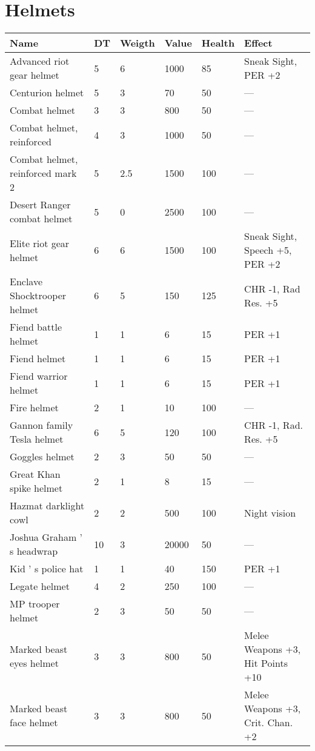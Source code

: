 \documentclass{report}
\begin{document}
\begin{table}[H]
\begin{table}[H]
\begin{table}[H]
\begin{table}[H]
\begin{table}[H]
\begin{table}[H]
\begin{table}[H]
\begin{table}[H]
\begin{table}[H]
\begin{table}[H]
\begin{table}[H]
\begin{table}[H]
\begin{table}[H]
\begin{table}[H]
\begin{table}[H]
\begin{table}[H]
\begin{table}[H]
\begin{table}[H]
\begin{table}[H]
\begin{table}[H]
\begin{table}[H]
\begin{table}[H]
\chapter{Helmets}
\begin{table}[H]
  \centering
  \begin{tabular}{p{30mm}p{30mm}p{30mm}p{30mm}p{30mm}p{30mm}}
\bfseries Name & \bfseries DT & \bfseries Weigth & \bfseries Value & \bfseries Health & \bfseries Effect \\
\hline
Advanced riot gear helmet  & 5 & 6 & 1000 & 85 & Sneak Sight, PER +2  \\
Centurion helmet  & 5 & 3 & 70 & 50 & —  \\
Combat helmet  & 3 & 3 & 800 & 50 & —  \\
Combat helmet, reinforced  & 4 & 3 & 1000 & 50 & —  \\
Combat helmet, reinforced mark 2  & 5 & 2.5  & 1500 & 100 & —  \\
Desert Ranger combat helmet  & 5 & 0 & 2500 & 100 & —  \\
Elite riot gear helmet  & 6 & 6 & 1500 & 100 & Sneak Sight, Speech +5, PER +2  \\
Enclave Shocktrooper helmet  & 6 & 5 & 150 & 125 & CHR -1, Rad Res. +5  \\
Fiend battle helmet  & 1 & 1 & 6 & 15 & PER +1  \\
Fiend helmet  & 1 & 1 & 6 & 15 & PER +1  \\
Fiend warrior helmet  & 1 & 1 & 6 & 15 & PER +1  \\
Fire helmet  & 2 & 1 & 10 & 100 & —  \\
Gannon family Tesla helmet  & 6 & 5 & 120 & 100 & CHR -1, Rad. Res. +5  \\
Goggles helmet  & 2 & 3 & 50 & 50 & —  \\
Great Khan spike helmet  & 2 & 1 & 8 & 15 & —  \\
Hazmat darklight cowl  & 2 & 2 & 500 & 100 & Night vision  \\
Joshua Graham ' s headwrap  & 10 & 3 & 20000 & 50 & —  \\
Kid ' s police hat  & 1 & 1 & 40 & 150 & PER +1  \\
Legate helmet  & 4 & 2 & 250 & 100 & —  \\
MP trooper helmet  & 2 & 3 & 50 & 50 & —  \\
Marked beast eyes helmet  & 3 & 3 & 800 & 50 & Melee Weapons +3, Hit Points +10  \\
Marked beast face helmet  & 3 & 3 & 800 & 50 & Melee Weapons +3, Crit. Chan. +2  \\

\end{tabular}
\end{table}
\end{table}
\end{table}
\end{table}
\end{table}
\end{table}
\end{table}
\end{table}
\end{table}
\end{table}
\end{table}
\end{table}
\end{table}
\end{table}
\end{table}
\end{table}
\end{table}
\end{table}
\end{table}
\end{table}
\end{table}
\end{table}
\end{table}
\end{document}
